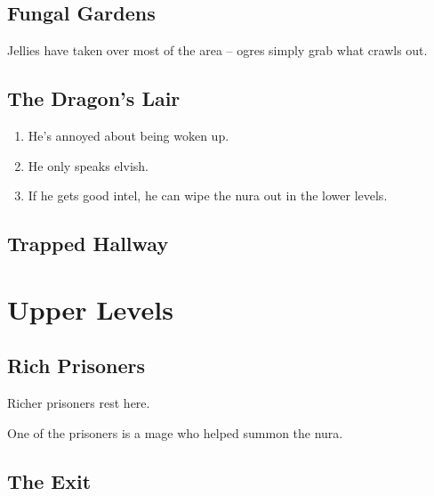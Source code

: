 \begin{multicols}{2}

\subsection{Fungal Gardens}

Jellies have taken over most of the area -- ogres simply grab what crawls out.

\jelly

\jelly

\subsection{The Dragon's Lair}

\dragon

\begin{enumerate}

	\item{He's annoyed about being woken up.}
	\item{He only speaks elvish.}
	\item{If he gets good intel, he can wipe the nura out in the lower levels.}

\end{enumerate}

\subsection{Trapped Hallway}

\end{multicols}

\section{Upper Levels}

\begin{multicols}{2}

\subsection{Rich Prisoners}

Richer prisoners rest here.

One of the prisoners is a mage who helped summon the nura.

\humandiplomat

\subsection{The Exit}

\umberhulk

\end{multicols}

